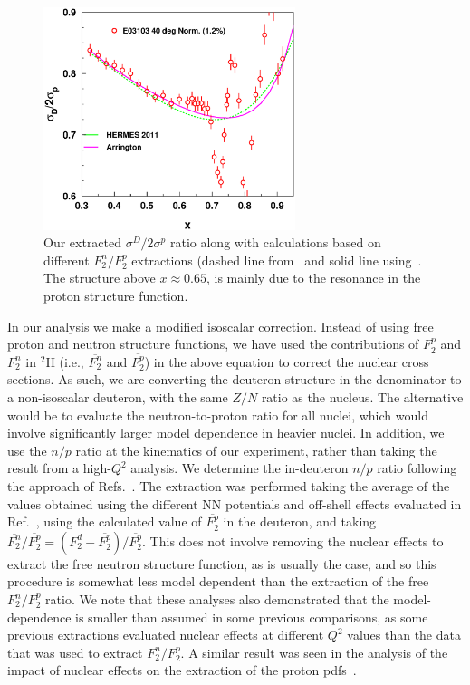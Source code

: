 \begin{figure}[htb]
\begin{center}
\includegraphics[height=65mm,angle=0]{plots/compare_dbyp_032012.eps}
\caption{Our extracted $\sigma^D/2\sigma^p$ ratio along with 
calculations based on different $F_2^n/F_2^p$ extractions (dashed line
from~\cite{hermes_dbyp} and solid line using~\cite{arrington09, arrington12b}.
The structure above $x \approx 0.65$, is mainly due to the resonance in the
proton structure function.
\label{dprat_fig}}
\end{center}
\end{figure}

In our analysis we make a modified isoscalar correction. Instead of using
free proton and neutron structure functions, we have used the contributions of
$F_2^p$ and  $F_2^n$ in $^2$H (i.e., $\overline{F_2^n}$ and
$\overline{F_2^p}$) in the above equation to correct the nuclear cross
sections.  As such, we are converting the deuteron structure in the 
denominator to a non-isoscalar deuteron, with the same $Z/N$ ratio as the
nucleus.  The alternative would be to evaluate the neutron-to-proton ratio
for all nuclei, which would involve significantly larger model dependence
in heavier nuclei.  In addition, we use the $n/p$ ratio at the kinematics of
our experiment, rather than taking the result from a high-$Q^2$ analysis.
We determine the in-deuteron $n/p$ ratio following the approach of
Refs.~\cite{arrington09, arrington12b}.  The extraction was performed 
taking the average of the values obtained using the different NN potentials
and off-shell effects evaluated in Ref.~\cite{arrington12b}, using the
calculated value of $\overline{F_2^p}$ in the deuteron, and taking
$\overline{F_2^n}/\overline{F_2^p} = (F_2^d -
\overline{F_2^p})/\overline{F_2^p}$. This does not involve removing the
nuclear effects to extract the free neutron structure function, as is 
usually the case, and so this procedure is somewhat less model dependent
than the extraction of the free $F_2^n/F_2^p$ ratio.  We note that these
analyses also demonstrated that the model-dependence is smaller than assumed
in some previous comparisons, as some previous extractions evaluated nuclear
effects at different $Q^2$ values than the data that was used to extract
$F_2^n/F_2^p$.  A similar result was seen in the analysis of the impact of
nuclear effects on the extraction of the proton pdfs~\cite{accardi11}.

